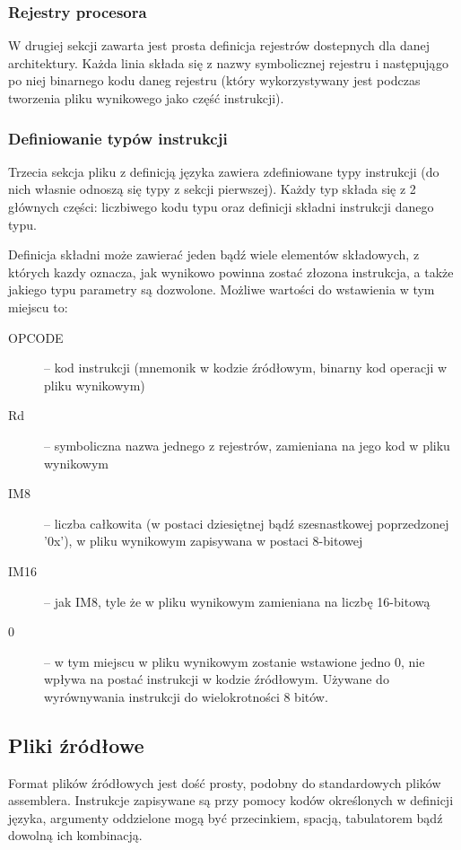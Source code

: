 \documentclass[a4paper,12pt]{report}
\begin{document}
\subsubsection{Rejestry procesora}

W drugiej sekcji zawarta jest prosta definicja rejestrów dostepnych dla danej architektury. Każda linia składa się z nazwy symbolicznej rejestru i następujągo po niej binarnego kodu daneg rejestru (który wykorzystywany jest podczas tworzenia pliku wynikowego jako część instrukcji).

\subsubsection{Definiowanie typów instrukcji}

Trzecia sekcja pliku z definicją języka zawiera zdefiniowane typy instrukcji (do nich własnie odnoszą się typy z sekcji pierwszej). Każdy typ składa się z 2 głównych części: liczbiwego kodu typu oraz definicji składni instrukcji danego typu.

Definicja składni może zawierać jeden bądź wiele elementów składowych, z których kazdy oznacza, jak wynikowo powinna zostać złozona instrukcja, a także jakiego typu parametry są dozwolone. Możliwe wartości do wstawienia w tym miejscu to:
\begin{description}
  \item[OPCODE] -- kod instrukcji (mnemonik w kodzie źródłowym, binarny kod operacji w pliku wynikowym)
  \item[Rd] -- symboliczna nazwa jednego z rejestrów, zamieniana na jego kod w pliku wynikowym
  \item[IM8] -- liczba całkowita (w postaci dziesiętnej bądź szesnastkowej poprzedzonej '0x'), w pliku wynikowym zapisywana w postaci 8-bitowej
  \item[IM16] -- jak IM8, tyle że w pliku wynikowym zamieniana na liczbę 16-bitową
  \item[0] -- w tym miejscu w pliku wynikowym zostanie wstawione jedno 0, nie wpływa na postać instrukcji w kodzie źródłowym. Używane do wyrównywania instrukcji do wielokrotności 8 bitów.
\end{description}

\subsection{Pliki źródłowe}

Format plików źródłowych jest dość prosty, podobny do standardowych plików assemblera. Instrukcje zapisywane są przy pomocy kodów określonych w definicji języka, argumenty oddzielone mogą być przecinkiem, spacją, tabulatorem bądź dowolną ich kombinacją. 
\end{document}
